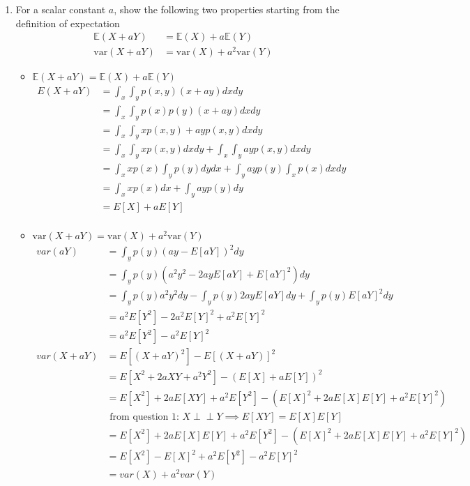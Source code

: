 \documentclass[12pt,letter]{article}
\newcommand{\indep}{\perp \!\!\! \perp}
\begin{document}
\begin{enumerate}
\item For a scalar constant $a$, show the following two properties starting from the definition of expectation
  \begin{align}
    \mathbb{E}(X+aY) &= \mathbb{E}(X) + a\mathbb{E}(Y)\\
    \text{var}(X + aY) &= \text{var}(X) + a^2 \text{var}(Y)
  \end{align}
  \begin{itemize}    
  \item $\mathbb{E}(X+aY) = \mathbb{E}(X) + a\mathbb{E}(Y)$
      \begin{align*}
        E(X+aY)&=\int_x \int_y p(x,y)(x+ay) dxdy\\
               &=\int_x \int_y p(x)p(y)(x+ay) dxdy\\
               &=\int_x \int_y xp(x,y) + ay p(x,y) dxdy\\
               &=\int_x \int_y xp(x,y) dxdy + \int_x \int_y ay p(x,y) dxdy\\
               &=\int_x xp(x) \int_y p(y) dy dx + \int_y ay p(y) \int_x  p(x) dx dy\\
               &=\int_x xp(x) dx + \int_y ay p(y) dy\\
               &=E[X] + a E[Y]\\
      \end{align*}
    \item $\text{var}(X + aY) = \text{var}(X) + a^2 \text{var}(Y)$
      \begin{align*}
        var(aY)&= \int_y p(y)(ay-E[aY])^2 dy\\
               &= \int_y p(y)(a^2y^2 - 2ayE[aY] + E[aY]^2) dy\\
               &= \int_y p(y)a^2y^2dy - \int_y p(y)2ayE[aY] dy + \int_y p(y)E[aY]^2 dy\\
               &= a^2E[Y^2] - 2a^2E[Y]^2 + a^2 E[Y]^2\\
               &= a^2E[Y^2] - a^2E[Y]^2\\
        var(X+aY)&= E[(X+aY)^2]-E[(X+aY)]^2\\
               &= E[X^2+2aXY+a^2Y^2]-(E[X]+aE[Y])^2\\
               &= E[X^2]+2aE[XY]+a^2E[Y^2]-(E[X]^2+2aE[X]E[Y]+a^2E[Y]^2)\\
               &\text{ from question 1: } X \indep Y \implies E[XY] = E[X]E[Y]\\
               &= E[X^2]+2aE[X]E[Y]+a^2E[Y^2]-(E[X]^2+2aE[X]E[Y]+a^2E[Y]^2)\\
               &= E[X^2]-E[X]^2+a^2E[Y^2]-a^2E[Y]^2\\
               &= var(X)+a^2var(Y)\\
      \end{align*}      
  \end{itemize}
\end{enumerate}
\end{document}
